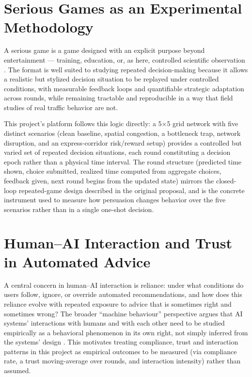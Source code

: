 \documentclass[11pt]{article}
\begin{document}
\section{Serious Games as an Experimental Methodology}
A serious game is a game designed with an explicit purpose beyond entertainment --- training, education, or, as here, controlled scientific observation \citep{abt1970, michaelchen2005}. The format is well suited to studying repeated decision-making because it allows a realistic but stylized decision situation to be replayed under controlled conditions, with measurable feedback loops and quantifiable strategic adaptation across rounds, while remaining tractable and reproducible in a way that field studies of real traffic behavior are not.

This project's platform follows this logic directly: a 5$\times$5 grid network with five distinct scenarios (clean baseline, spatial congestion, a bottleneck trap, network disruption, and an express-corridor risk/reward setup) provides a controlled but varied set of repeated decision situations, each round constituting a decision epoch rather than a physical time interval. The round structure (predicted time shown, choice submitted, realized time computed from aggregate choices, feedback given, next round begins from the updated state) mirrors the closed-loop repeated-game design described in the original proposal, and is the concrete instrument used to measure how persuasion changes behavior over the five scenarios rather than in a single one-shot decision.

\section{Human--AI Interaction and Trust in Automated Advice}
A central concern in human--AI interaction is reliance: under what conditions do users follow, ignore, or override automated recommendations, and how does this reliance evolve with repeated exposure to advice that is sometimes right and sometimes wrong? The broader ``machine behaviour'' perspective argues that AI systems' interactions with humans and with each other need to be studied empirically as a behavioral phenomenon in its own right, not simply inferred from the systems' design \citep{rahwan2019}. This motivates treating compliance, trust and interaction patterns in this project as empirical outcomes to be measured (via compliance rate, a trust moving-average over rounds, and interaction intensity) rather than assumed.
\end{document}
